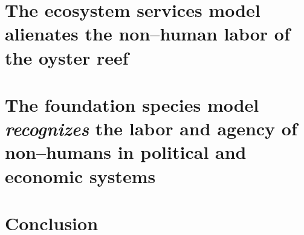 \documentclass{article}
\begin{document}
\section{The ecosystem services model alienates the non--human labor of the oyster reef}

\section{The foundation species model \emph{recognizes} the labor and agency of non--humans in political and economic systems}

\section{Conclusion}




\end{document}
